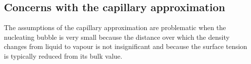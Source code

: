 



\subsection{Concerns with the capillary approximation}

The assumptions of the capillary approximation are problematic when the nucleating bubble is very small\cite{Talanquer1995}
because the distance over which the density changes from liquid to vapour is not insignificant
and because the surface tension is typically reduced from its bulk value\cite{Kiang1971}.


